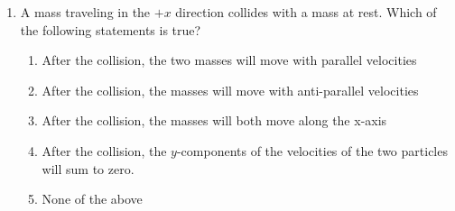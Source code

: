 \documentclass{../../../oss-apphys}
\begin{document}
\begin{multicols}{2}
\begin{enumerate}[resume,leftmargin=18pt]
  \item A mass traveling in the $+x$ direction collides with a mass at rest.
    Which of the following statements is true?
    \begin{enumerate}[nosep,leftmargin=18pt,label=(\Alph*)]
    \item After the collision, the two masses will move with parallel velocities
    \item After the collision, the masses will move with anti-parallel
      velocities
    \item After the collision, the masses will both move along the x-axis
    \item After the collision, the $y$-components of the velocities of the two
      particles will sum to zero.
    \item None of the above
    \end{enumerate}
  \end{enumerate}
\end{multicols}
\newpage



\genfreedirections
\end{document}
